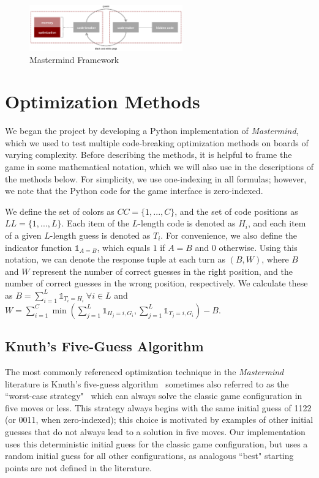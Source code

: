 \documentclass[11pt]{article}
\begin{document}
\begin{figure}[!htbp]
\centering
\includegraphics[width=0.59\textwidth]{img/game_setup}
\caption{Mastermind Framework}
\label{fig:game_setup}
\end{figure}

\newpage

\section{Optimization Methods}

We began the project by developing a Python implementation of \textit{Mastermind}, which we used to test multiple code-breaking optimization methods on boards of varying complexity. Before describing the methods, it is helpful to frame the game in some mathematical notation, which we will also use in the descriptions of the methods below. For simplicity, we use one-indexing in all formulas; however, we note that the Python code for the game interface is zero-indexed.

We define the set of colors as $CC = \{1, ..., C\}$, and the set of code positions as $LL = \{1, ..., L\}$. Each item of the $L$-length code is denoted as  $H_i$, and each item of a given $L$-length guess is denoted as $T_i$. For convenience, we also define the indicator function $\mathbb{1}_{A=B}$, which equals $1$ if $A=B$ and $0$ otherwise. Using this notation, we can denote the response tuple at each turn as $(B, W)$, where $B$ and $W$ represent the number of correct guesses in the right position, and the number of correct guesses in the wrong position, respectively. We calculate these as $B= \sum_{i=1}^L \mathbb{1}_{T_i=H_i} \ \forall i \in L$ and $W = \sum_{i=1}^{C} \min(\sum_{j=1}^{L}\mathbb{1}_{H_j=i, G_i}, \sum_{j=1}^{L}\mathbb{1}_{T_j=i, G_i}) - B$.

\subsection{Knuth's Five-Guess Algorithm}

The most commonly referenced optimization technique in the \textit{Mastermind} literature is Knuth's five-guess algorithm \cite{knuth76} \textendash \ sometimes also referred to as the ``worst-case strategy" \textendash \ which can always solve the classic game configuration in five moves or less. This strategy always begins with the same initial guess of 1122 (or 0011, when zero-indexed); this choice is motivated by examples of other initial guesses that do not always lead to a solution in five moves. Our implementation uses this deterministic initial guess for the classic game configuration, but uses a random initial guess for all other configurations, as analogous ``best" starting points are not defined in the literature.
\end{document}

